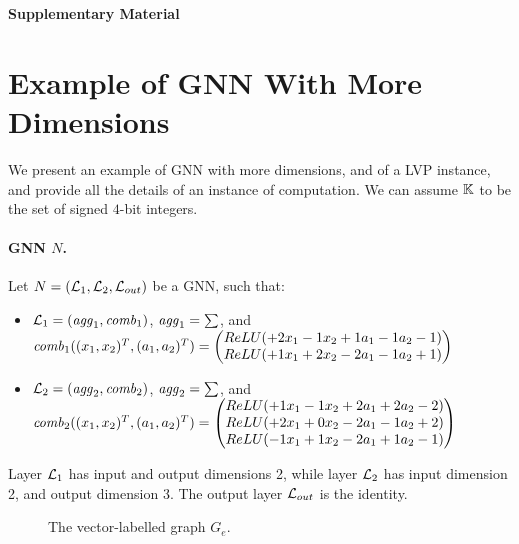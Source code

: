 \noindent \textbf{ \huge Supplementary Material
}

\section{Example of GNN With More Dimensions}

We present an example of GNN with more dimensions, and of a LVP instance, and provide all the details of an instance of computation. We can assume $\mathbb K$ to be the set of signed $4$-bit integers.



\paragraph{GNN $N$.}
Let $N = (\mathcal{L}_1, \mathcal{L}_2, \mathcal{L}_{out})$ be a GNN, such that:
\begin{itemize}
    \item $\mathcal{L}_1 = (\mathit{agg}_1, \mathit{comb}_1)$, $\mathit{agg}_1 = \sum$, and $\mathit{comb}_1((x_1, x_2)^T, (a_1, a_2)^T) = 
    \begin{pmatrix}
    ReLU(+2x_1 - 1x_2 + 1a_1 - 1a_2 - 1) \\
    ReLU(+1x_1 + 2x_2 - 2a_1 - 1a_2 + 1)
    \end{pmatrix}$
    \item $\mathcal{L}_2 = (\mathit{agg}_2, \mathit{comb}_2)$,
    $\mathit{agg}_2 = \sum$, and $\mathit{comb}_2((x_1, x_2)^T, (a_1, a_2)^T) = 
    \begin{pmatrix}
    ReLU(+1x_1 - 1x_2 + 2a_1 + 2a_2 - 2) \\
    ReLU(+2x_1 + 0x_2 - 2a_1 - 1a_2 + 2) \\
    ReLU(-1x_1 + 1x_2 - 2a_1 + 1a_2 - 1)
    \end{pmatrix}$
\end{itemize}
Layer $\mathcal{L}_1$ has input and output dimensions 2, while layer $\mathcal{L}_2$ has input dimension 2, and output dimension 3. The output layer $\mathcal{L}_{out}$ is the identity.


\begin{figure}[h]
    \centering
    \caption{The vector-labelled graph $G_e$.}
    \label{fig:graph2}
\end{figure}

